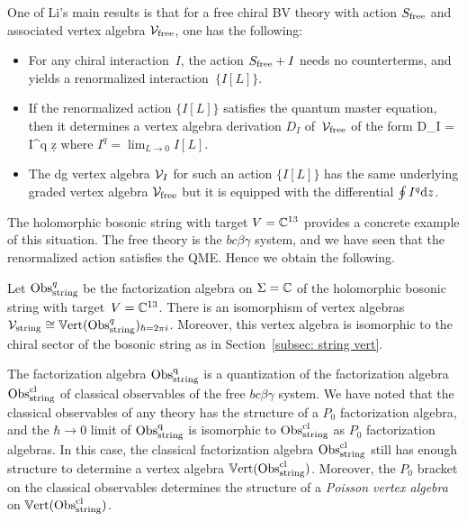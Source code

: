 One of Li's main results is that for a free chiral BV theory with action $S_{\rm free}$ and associated vertex algebra $\mathcal{V}_{\rm free}$, one has the following:
\begin{itemize}
\item For any chiral interaction~$I$, the action $S_{\rm free} + I$ needs no counterterms, 
and yields a renormalized interaction~$\{I [L]\}$.
\item If the renormalized action $\{I[L]\}$ satisfies the quantum master equation,
then it determines a vertex algebra derivation $D_I$ of~$\mathcal{V}_{\rm free}$ of the form
\ben
D_I = \oint I^q \d z
\een
where $I^q = \lim_{L \to 0} I[L]$.
\item The dg vertex algebra $\mathcal{V}_I$ for such an action $\{I[L]\}$ has the same underlying graded vertex algebra $\mathcal{V}_{\rm free}$ but it is equipped with the differential $\oint I^q {\rm d} z$. 
\end{itemize}


The holomorphic bosonic string with target $V=\mathbb C^{13}$ provides a concrete example of this situation.
The free theory is the $bc\beta\gamma$ system, 
and we have seen that the renormalized action satisfies the QME.
Hence we obtain the following.

\begin{prop} 
Let ${\rm Obs}^q_{\rm string}$ be the factorization algebra on $\Sigma = \mathbb C$ of the holomorphic bosonic string with target~$V = \mathbb C^{13}$. 
There is an isomorphism of vertex algebras $\mathcal{V}_{\rm string} \cong \mathbb{V}{\rm ert}({\rm Obs}^q_{\rm string})_{\hbar = 2 \pi i}$.
Moreover, this vertex algebra is isomorphic to the chiral sector of the bosonic string as in Section~\ref{subsec: string vert}.
\end{prop}

The factorization algebra ${\rm Obs}^{\rm q}_{\rm string}$ is a quantization of the factorization algebra ${\rm Obs}^{{\rm cl}}_{\rm string}$ of classical observables of the free $bc\beta\gamma$ system.
We have noted that the classical observables of any theory has the structure of a $P_0$ factorization algebra, and the $\hbar \to 0$ limit of ${\rm Obs}^{\rm q}_{\rm string}$ is isomorphic to ${\rm Obs}^{{\rm cl}}_{\rm string}$ as $P_0$ factorization algebras. 
In this case, the classical factorization algebra ${\rm Obs}^{{\rm cl}}_{\rm string}$ still has enough structure to determine a vertex algebra $\mathbb{V}{\rm ert}({\rm Obs}^{\rm cl}_{\rm string})$.
Moreover, the $P_0$ bracket on the classical observables determines the structure of a {\em Poisson vertex algebra} on $\mathbb{V}{\rm ert}({\rm Obs}^{{\rm cl}}_{\rm string})$. 

